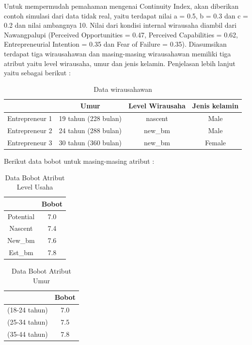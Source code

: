 Untuk mempermudah pemahaman mengenai Continuity Index, akan diberikan contoh simulasi dari data tidak real, yaitu terdapat nilai a = 0.5, b = 0.3 dan c = 0.2 dan nilai ambangnya 10. Nilai dari kondisi internal wirausaha diambil dari Nawangpalupi (Perceived Opportunities = 0.47, Perceived Capabilities = 0.62, Entrepreneurial Intention = 0.35 dan Fear of Failure = 0.35). Diasumsikan terdapat tiga wirausahawan dan masing-masing wirausahawan memiliki tiga atribut yaitu level wirausaha, umur dan jenis kelamin. Penjelasan lebih lanjut yaitu sebagai berikut :
				
\begin{table} [H]
\centering
\caption{Data wirausahawan}
\begin{tabular}{|c|c|c|c|}
\hline
& Umur & Level Wirausaha & Jenis kelamin\\
\hline
Entrepreneur 1 & 19 tahun (228 bulan) & nascent & Male\\
\hline
Entrepreneur 2 & 24 tahun (288 bulan) & new\_bm & Male\\
\hline
Entrepreneur 3 & 30 tahun (360 bulan) & new\_bm & Female\\
\hline
\end{tabular}
\end{table}


Berikut data bobot untuk masing-masing atribut :

\begin{table} [H]
\centering
\caption{Data Bobot Atribut Level Usaha}
\begin{tabular}{|c|c|}
\hline
& Bobot\\
\hline
Potential & 7.0\\
\hline
Nascent & 7.4\\
\hline
New\_bm & 7.6\\
\hline
Est\_bm & 7.8\\
\hline
\end{tabular}
\end{table}

\begin{table} [H]
\centering
\caption{Data Bobot Atribut Umur}
\begin{tabular}{|c|c|}
\hline
& Bobot\\
\hline
(18-24 tahun) & 7.0\\
\hline
(25-34 tahun) & 7.5\\
\hline
(35-44 tahun) & 7.8\\
\hline
\end{tabular}
\end{table}


